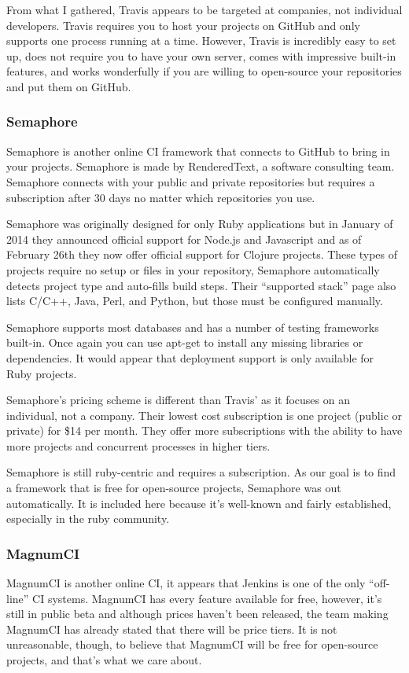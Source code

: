 \documentclass[11pt]{article}
\begin{document}
From what I gathered, Travis appears to be targeted at companies, not individual developers. Travis requires you to host your projects on GitHub and only supports one process running at a time. However, Travis is incredibly easy to set up, does not require you to have your own server, comes with impressive built-in features, and works wonderfully if you are willing to open-source your repositories and put them on GitHub.

\subsubsection{Semaphore \cite{Semaphore}}
Semaphore is another online CI framework that connects to GitHub to bring in your projects. Semaphore is made by RenderedText, a software consulting team. Semaphore connects with your public and private repositories but requires a subscription after 30 days no matter which repositories you use.

Semaphore was originally designed for only Ruby applications but in January of 2014 they announced official support for Node.js and Javascript and as of February 26th they now offer official support for Clojure projects.\cite{SemaphoreBlog} These types of projects require no setup or files in your repository, Semaphore automatically detects project type and auto-fills build steps. Their ``supported stack'' page also lists C/C++, Java, Perl, and Python, but those must be configured manually. 

Semaphore supports most databases and has a number of testing frameworks built-in. Once again you can use apt-get to install any missing libraries or dependencies. It would appear that deployment support is only available for Ruby projects.

Semaphore's pricing scheme is different than Travis' as it focuses on an individual, not a company. Their lowest cost subscription is one project (public or private) for \$14 per month. They offer more subscriptions with the ability to have more projects and concurrent processes in higher tiers.

Semaphore is still ruby-centric and requires a subscription. As our goal is to find a framework that is free for open-source projects, Semaphore was out automatically. It is included here because it's well-known and fairly established, especially in the ruby community.

\subsubsection{MagnumCI \cite{MagnumCI}}
MagnumCI is another online CI, it appears that Jenkins is one of the only ``off-line'' CI systems. MagnumCI has every feature available for free, however, it's still in public beta and although prices haven't been released, the team making MagnumCI has already stated that there will be price tiers. It is not unreasonable, though, to believe that MagnumCI will be free for open-source projects, and that's what we care about.
\end{document}
